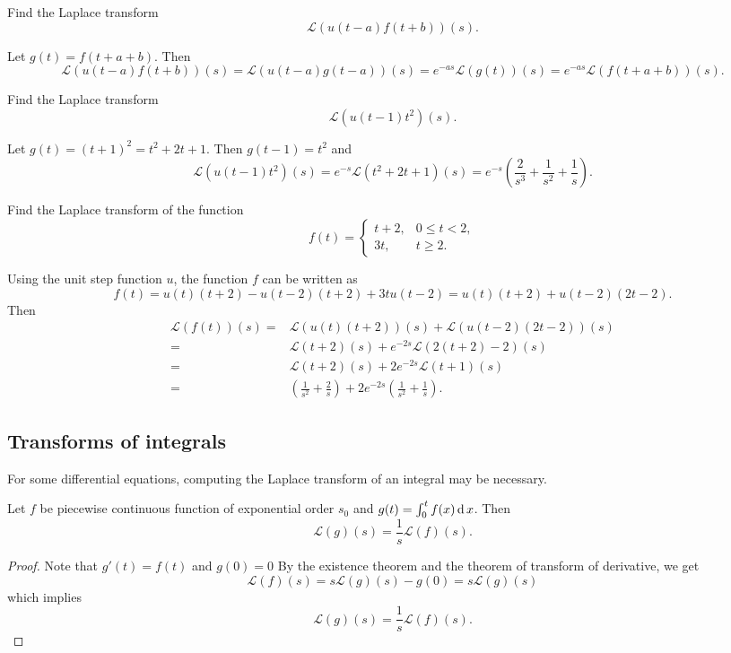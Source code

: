 \begin{example}
  Find the Laplace transform
  \[\mathcal{L}(u(t-a)f(t+b))(s).\]
\end{example}
\begin{solution}
  Let $g(t)=f(t+a+b)$. Then
  \[\mathcal{L}(u(t-a)f(t+b))(s)=\mathcal{L}(u(t-a)g(t-a))(s)=e^{-as}\mathcal{L}(g(t))(s)=e^{-as}\mathcal{L}(f(t+a+b))(s).\]
\end{solution}

\begin{example}
  Find the Laplace transform
  \[\mathcal{L}(u(t-1)t^2)(s).\]
\end{example}
\begin{solution}
  Let $g(t)=(t+1)^2=t^2+2t+1$. Then $g(t-1)=t^2$ and 
  \[\mathcal{L}(u(t-1)t^2)(s)=e^{-s}\mathcal{L}(t^2+2t+1)(s)=e^{-s}\left(\frac{2}{s^3}+\frac{1}{s^2}+\frac1s\right).\]
\end{solution}

\begin{example}
  Find the Laplace transform of the function
\[
  f(t)=
\begin{cases} t+2, & 0\le t<2,\\[4pt]3t,&t\ge 2.
\end{cases}
\]
\end{example}
\begin{solution}
  Using the unit step function $u$, the function $f$ can be written as
  \[f(t)=u(t)(t+2)-u(t-2)(t+2)+3t u(t-2)=u(t)(t+2)+u(t-2)(2t-2).\]
  Then
  \[
  \begin{aligned}
    \mathcal{L}(f(t))(s)
    =&\mathcal{L}(u(t)(t+2))(s)+\mathcal{L}(u(t-2)(2t-2))(s)\\
    =&\mathcal{L}(t+2)(s) + e^{-2s}\mathcal{L}(2(t+2)-2)(s) \\
    =&\mathcal{L}(t+2)(s) + 2e^{-2s}\mathcal{L}(t+1)(s) \\
    =&\left(\frac{1}{s^2}+\frac{2}{s}\right) + 2e^{-2s}\left(\frac{1}{s^2}+\frac{1}{s}\right).
  \end{aligned}  
  \]
\end{solution}

\subsection*{Transforms of integrals}

For some differential equations, computing the Laplace transform of an integral may be necessary.

\begin{theorem}
  Let $f$ be piecewise continuous function of exponential order $s_0$ and $g(t)=\int_0^tf(x)\operatorname{d} x$. Then
  \[\mathcal{L}(g)(s)=\frac1s\mathcal{L}(f)(s).\] 
\end{theorem}
\begin{proof}
  Note that $g'(t)=f(t)$ and $g(0)=0$
  By the existence theorem and the theorem of transform of derivative, we get
  \[\mathcal{L}(f)(s)=s\mathcal{L}(g)(s)-g(0)=s\mathcal{L}(g)(s)\]
  which implies
  \[\mathcal{L}(g)(s)=\frac1s\mathcal{L}(f)(s).\]
\end{proof}

